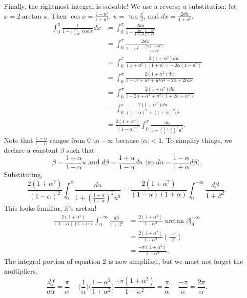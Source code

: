 \documentclass{article}
\begin{document}
Finally, the rightmost integral is solvable! We use a reverse $u$ substitution: let $x=2\arctan{u}$. Then $\cos{x}=\frac{1-u^2}{1+u^2}$, $u=\tan{\frac{x}{2}}$, and $dx=\frac{2du}{1+u^2}$.
\begin{equation*}
    \begin{split}
        \int_{0}^{\pi}\frac{1}{1-\frac{2\alpha}{1+\alpha^2}\cos{x}}dx &= \int_{0}^{\pi}\frac{2du}{1-\frac{2\alpha}{1+\alpha^2}\frac{1-u^2}{1+u^2}}\\
        &= \int_{0}^{\pi}\frac{2du}{1+u^2-\frac{2\alpha(1-u^2)}{1+\alpha^2}} \\&= \int_{0}^{\pi}\frac{2(1+\alpha^2)du}{(1+u^2)(1+\alpha^2)-2\alpha(1-u^2)}
        \\&= \int_{0}^{\pi}\frac{2(1+\alpha^2)du}{1+u^2+\alpha^2+u^2\alpha^2-2\alpha+2\alpha u^2} \\&= \int_{0}^{\pi}\frac{2(1+\alpha^2)du}{1-2\alpha+\alpha^2+u^2(1+2\alpha+\alpha^2)}\\&= \int_{0}^{\pi}\frac{2(1+\alpha^2)du}{(1-\alpha)^2+(1+\alpha)^2u^2} \\&= \frac{2(1+\alpha^2)}{(1-\alpha)^2}\int_{0}^{\pi}\frac{du}{1+(\frac{1+\alpha}{1-\alpha})^2u^2}.
    \end{split}
\end{equation*}
Note that $\frac{1+\alpha}{1-\alpha}$ ranges from 0 to $-\infty$ because $|\alpha|<1$. To simplify things, we declare a constant $\beta$ such that $$\beta=\frac{1+\alpha}{1-\alpha}u \text{ and } d\beta=\frac{1+\alpha}{1-\alpha}du \text { (so } du=\frac{1-\alpha}{1+\alpha}d\beta \text{)}.$$
Substituting,
$$\frac{2(1+\alpha^2)}{(1-\alpha)^2}\int_{0}^{\pi}\frac{du}{1+(\frac{1+\alpha}{1-\alpha})^2u^2} = \frac{2(1+\alpha^2)}{(1-\alpha)(1+\alpha)}\int_{0}^{-\infty}\frac{d\beta}{1+\beta^2}.$$
This looks familiar, it's arctan!
\begin{equation*}
    \begin{split}
        \frac{2(1+\alpha^2)}{(1-\alpha)(1+\alpha)}\int_{0}^{-\infty}\frac{d\beta}{1+\beta^2} &= \frac{2(1+\alpha^2)}{1-\alpha^2}\arctan{\beta}\bigg\vert_{0}^{-\infty}
        \\&= \frac{2(1+\alpha^2)}{1-\alpha^2}(\frac{-\pi}{2}) \\&= \frac{-\pi(1+\alpha^2)}{1-\alpha^2}.
    \end{split}
\end{equation*}
The integral portion of equation 2 is now simplified, but we must not forget the multipliers.
$$\frac{df}{d\alpha} = \frac{\pi}{\alpha}-\bigg(\frac{1}{\alpha}\bigg)\bigg(\frac{1-\alpha^2}{1+\alpha^2}\bigg)\frac{-\pi(1+\alpha^2)}{1-\alpha^2} = \frac{\pi}{\alpha}-\frac{-\pi}{\alpha} = \frac{2\pi}{\alpha}.$$
\end{document}
